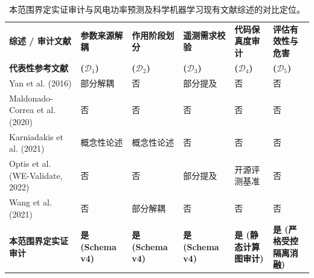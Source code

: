 \begin{table}[!t]
\centering
\small
\caption{本范围界定实证审计与风电功率预测及科学机器学习现有文献综述的对比定位。}
\label{tab:lit_comparison}
\begin{tabularx}{\textwidth}{p{4.2cm}>{\centering\arraybackslash}X>{\centering\arraybackslash}X>{\centering\arraybackslash}X>{\centering\arraybackslash}X>{\centering\arraybackslash}X}
\toprule
\textbf{综述 / 审计文献} & \textbf{参数来源解耦} & \textbf{作用阶段划分} & \textbf{遥测需求校验} & \textbf{代码保真度审计} & \textbf{评估有效性与危害} \\
\textbf{代表性参考文献} & \textbf{($\mathcal{D}_1$)} & \textbf{($\mathcal{D}_2$)} & \textbf{($\mathcal{D}_3$)} & \textbf{($\mathcal{D}_4$)} & \textbf{($\mathcal{D}_5$)} \\
\midrule
Yan et al. (2016) \cite{yan2016review} & 部分解耦 & 否 & 部分提及 & 否 & 否 \\
Maldonado-Correa et al. (2020) \cite{maldonadocorrea2020slr} & 否 & 否 & 否 & 否 & 否 \\
Karniadakis et al. (2021) \cite{karniadakis2021physics} & 概念性论述 & 概念性论述 & 否 & 否 & 否 \\
Optis et al. (WE-Validate, 2022) \cite{optis2022} & 否 & 否 & 部分提及 & 开源评测基准 & 否 \\
Wang et al. (2021) \cite{wang2021review} & 否 & 部分解耦 & 否 & 否 & 否 \\
\midrule
\textbf{本范围界定实证审计} & \textbf{是 (Schema v4)} & \textbf{是 (Schema v4)} & \textbf{是 (Schema v4)} & \textbf{是 (静态计算图审计)} & \textbf{是 (严格受控隔离消融)} \\
\bottomrule
\end{tabularx}
\end{table}
